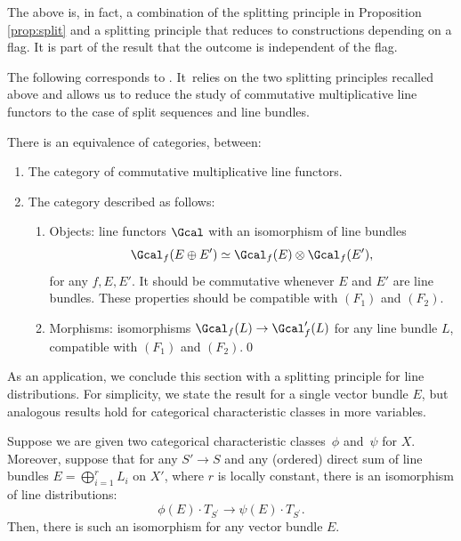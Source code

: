 \begin{remark}\label{rmk:indepedenceoffiltration}
The above is, in fact, a combination of the splitting principle in Proposition \ref{prop:split} and a splitting principle that reduces to constructions depending on a flag. It is part of the result that the outcome is independent of the flag.
\end{remark}

The following corresponds to \cite[Prop.\,2.16 \& Prop.\,2.19 \& Cor.\,2.20]{Eriksson-Freixas-Wentworth}. It~relies on the two splitting principles recalled above and allows us to reduce the study of commutative multiplicative line functors to the case of split sequences and line bundles.
\begin{corollary} \label{Cor:2ndsplitting}
There is an equivalence of categories, between:
\begin{enumerate}
\item The category of commutative multiplicative line functors.
\item The category described as follows:
\begin{enumerate}
\item Objects: line functors $\Gcal$ with an isomorphism of line bundles\vspace*{-3pt}\enlargethispage{.5\baselineskip}
\[
\Gcal_f(E \oplus E') \simeq \Gcal_f(E) \otimes \Gcal_f(E'),
\]
for any $f, E, E'$.
It should be commutative whenever $E$ and $E'$ are line bundles. These properties should be compatible with $(F_1)$ and $(F_2)$.
\item Morphisms: isomorphisms $\Gcal_f(L) \to \Gcal'_f(L)$ for any line bundle $L$, compatible with $(F_1)$ and $(F_2)$.\qed
\end{enumerate}
\end{enumerate}
\end{corollary}

As an application, we conclude this section with a splitting principle for line distributions. For simplicity, we state the result for a single vector bundle $E$, but analogous results hold for categorical characteristic classes in more variables.

\begin{corollary} \label{cor:splittingdistribution}
Suppose we are given two categorical characteristic classes~$\phi$ and~$\psi$ for $X$. Moreover, suppose that for any $S' \to S$ and any (ordered) direct sum of line bundles $E = \bigoplus_{i=1}^r L_i$ on $X'$, where $r$ is locally constant, there is an isomorphism of line distributions:\vspace*{-3pt}
\begin{displaymath}
\phi(E) \cdot T_{S^{\prime}} \to \psi(E) \cdot T_{S^{\prime}}.
\end{displaymath}
Then, there is such an isomorphism for any vector bundle $E$.
\end{corollary}

